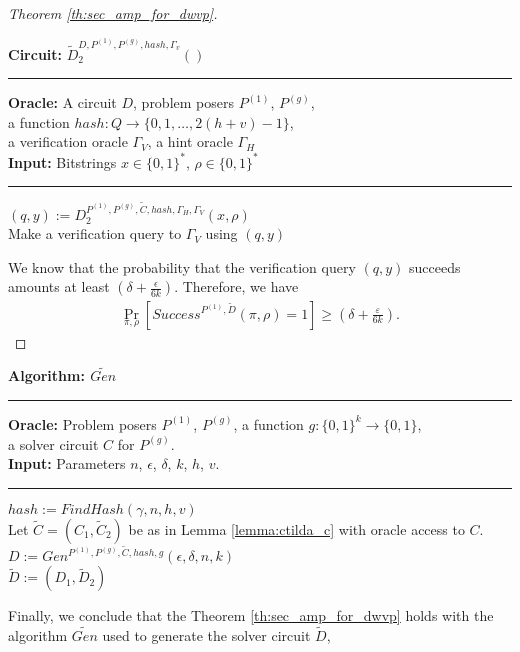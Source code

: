 \begin{proof}[Theorem \ref{th:sec_amp_for_dwvp}]
\begin{codeblock}
  \textbf{Circuit:} $\widetilde{D}_2^{D, P^{(1)}, P^{(g)}, hash, \Gamma_v}()$
  \medskip
  \hrule
  \medskip
  \textbf{Oracle:} A circuit $D$, problem posers $P^{(1)}$, $P^{(g)}$, \\
  \IndII a function $hash: Q \rightarrow \{0,1, \dots, 2(h+v) - 1\}$, \\
  \IndII a verification oracle $\Gamma_V$, a hint oracle $\Gamma_H$\\
  \textbf{Input:}  Bitstrings $x \in \{0,1\}^{*}$, $\rho \in \{0,1\}^{*}$
  \medskip\hrule\medskip
  $(q, y) := D_2^{P^{(1)}, P^{(g)}, \widetilde{C}, hash, \Gamma_H, \Gamma_V}(x, \rho)$ \\
  Make a verification query to $\Gamma_V$ using $(q,y)$
\end{codeblock}
We know that the probability that the verification query $(q,y)$ succeeds
amounts at least $(\delta + \frac{\epsilon}{6k})$.
Therefore, we have
\begin{align*}
    \underset{\pi, \rho}{\Pr}\left[Success^{P^{(1)},\widetilde{D}}(\pi, \rho) = 1\right] \geq (\delta + \frac{\varepsilon}{6k}).
\end{align*}
\end{proof}
%
\begin{codeblock}
  \textbf{Algorithm: $\widetilde{Gen}$}
  \medskip \hrule \medskip
  \textbf{Oracle:} Problem posers $P^{(1)}$, $P^{(g)}$, a function $g: \{0,1\}^{k} \rightarrow \{0,1\}$, \\
  \IndII a solver circuit $C$ for $P^{(g)}$.  \\
  \textbf{Input:} Parameters $n$, $\epsilon$, $\delta$, $k$, $h$, $v$.
  \medskip\hrule\medskip
  $hash := FindHash(\gamma, n, h, v)$ \\
  Let $\widetilde{C} = (C_1, \widetilde{C}_2)$ be as in Lemma \ref{lemma:ctilda_c} with oracle access to $C$. \\
  $D := Gen^{P^{(1)}, P^{(g)}, \widetilde{C}, hash, g}(\epsilon, \delta, n, k)$ \\
  \Return $\widetilde{D} := (D_1, \widetilde{D}_2)$
\end{codeblock}
%
Finally, we conclude that the Theorem \ref{th:sec_amp_for_dwvp} holds with the algorithm $\widetilde{Gen}$ used to generate the solver circuit $\widetilde{D}$,

